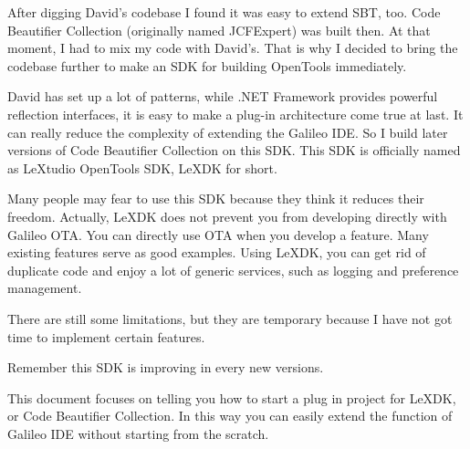 After digging David's codebase I found it was easy to extend SBT, too. Code
Beautifier Collection (originally named JCFExpert) was built then. At that
moment, I had to mix my code with David's. That is why I decided to bring the
codebase further to make an SDK for building OpenTools immediately. 

David has set up a lot of patterns, while .NET Framework provides powerful
reflection interfaces, it is easy to make a plug-in architecture come true at
last. It can really reduce the complexity of extending the Galileo IDE. So I
build later versions of Code Beautifier Collection on this SDK. This SDK is
officially named as LeXtudio OpenTools SDK, LeXDK for short.

Many people may fear to use this SDK because they think it reduces their freedom. 
Actually, LeXDK does not prevent you from developing directly with Galileo OTA.
You can directly use OTA when you develop a feature. Many existing features serve as
good examples. Using LeXDK, you can get rid of duplicate code and enjoy a lot of
generic services, such as logging and preference management.

There are still some limitations, but they are temporary because I have not got
time to implement certain features.

Remember this SDK is improving in every new versions.

This document focuses on telling you how to start a plug in project for LeXDK,
or Code Beautifier Collection. In this way you can easily extend the function of
Galileo IDE without starting from the scratch.
